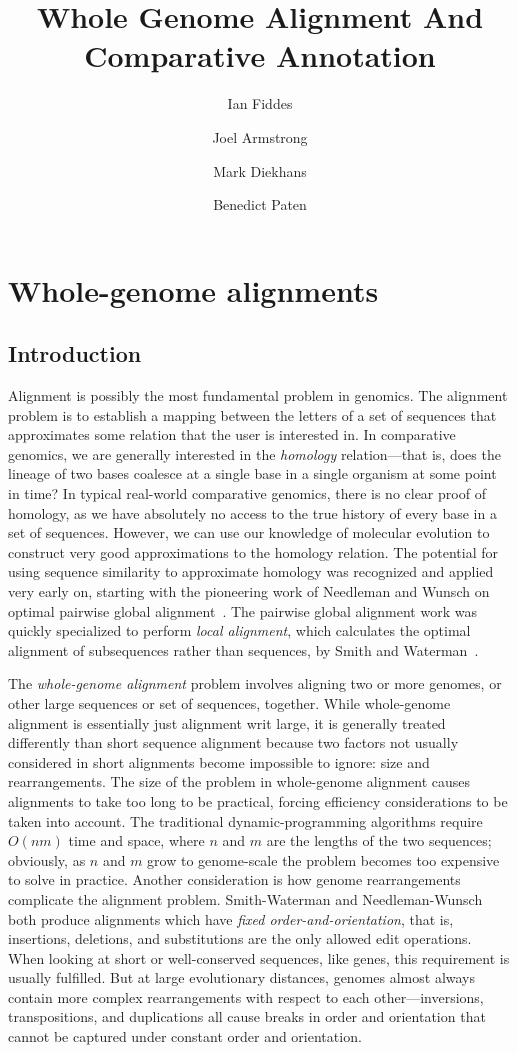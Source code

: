 \documentclass[fleqn,10pt]{wlscirep}
\title{Whole Genome Alignment And Comparative Annotation}
\author[1,+]{Ian Fiddes}
\author[1,+]{Joel Armstrong}
\author[1,]{Mark Diekhans}
\author[1,*]{Benedict Paten}
\affil[1]{UCSC}
\affil[*]{corresponding.author@email.example}
\affil[+]{these authors contributed equally to this work}
\begin{document}
\flushbottom
\maketitle

\thispagestyle{empty}

\section{Whole-genome alignments}
\subsection{Introduction}
Alignment is possibly the most fundamental problem in genomics.
The alignment problem is to establish a mapping between the letters of a set of sequences that approximates some relation that the user is interested in.
In comparative genomics, we are generally interested in the \emph{homology} relation---that is, does the lineage of two bases coalesce at a single base in a single organism at some point in time?
In typical real-world comparative genomics, there is no clear proof of homology, as we have absolutely no access to the true history of every base in a set of sequences.
However, we can use our knowledge of molecular evolution to construct very good approximations to the homology relation.
The potential for using sequence similarity to approximate homology was recognized and applied very early on, starting with the pioneering work of Needleman and Wunsch on optimal pairwise global alignment~\cite{Needleman1970443}.
The pairwise global alignment work was quickly specialized to perform \emph{local alignment}, which calculates the optimal alignment of subsequences rather than sequences, by Smith and Waterman~\cite{Smith1981}.

The \emph{whole-genome alignment} problem involves aligning two or more genomes, or other large sequences or set of sequences, together.
While whole-genome alignment is essentially just alignment writ large, it is generally treated differently than short sequence alignment because two factors not usually considered in short alignments become impossible to ignore: size and rearrangements.
The size of the problem in whole-genome alignment causes alignments to take too long to be practical, forcing efficiency considerations to be taken into account.
The traditional dynamic-programming algorithms require $O(nm)$ time and space, where $n$ and $m$ are the lengths of the two sequences; obviously, as $n$ and $m$ grow to genome-scale the problem becomes too expensive to solve in practice.
Another consideration is how genome rearrangements complicate the alignment problem.
Smith-Waterman and Needleman-Wunsch both produce alignments which have \emph{fixed order-and-orientation}, that is, insertions, deletions, and substitutions are the only allowed edit operations.
When looking at short or well-conserved sequences, like genes, this requirement is usually fulfilled.
But at large evolutionary distances, genomes almost always contain more complex rearrangements with respect to each other---inversions, transpositions, and duplications all cause breaks in order and orientation that cannot be captured under constant order and orientation.
\end{document}
